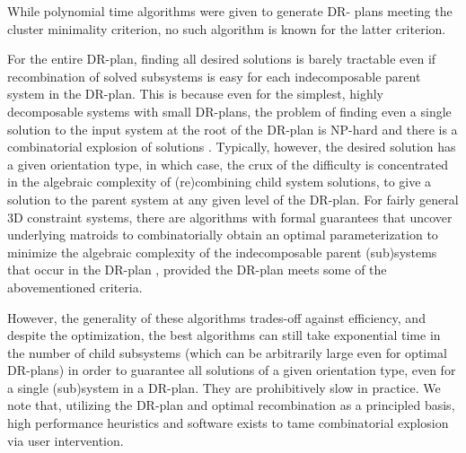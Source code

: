 While polynomial time algorithms were given \cite{hoffman2001decompositionI} to generate DR-
plans meeting the cluster minimality criterion, no such algorithm is
known for the latter criterion.


\medskip\noindent
{}
For the entire DR-plan, finding all desired solutions is barely
tractable even if recombination of solved subsystems is easy for each
indecomposable parent system in the DR-plan. This is because even for
the simplest, highly decomposable systems with small DR-plans, the
problem of finding even a single solution to the input system at the
root of the DR-plan is NP-hard  \cite{saxe1979embeddability}
and there is a combinatorial explosion of solutions \cite{borcea2004number}. Typically, however, the desired
solution has a given orientation type, in which case, the crux of the
difficulty is concentrated in the algebraic complexity of
(re)combining child system solutions, to give a solution to the parent
system at any given level of the DR-plan. For fairly general 3D
constraint systems, there are algorithms with formal guarantees that
uncover underlying matroids to combinatorially obtain an optimal
parameterization to minimize the algebraic complexity of the
indecomposable parent (sub)systems that occur in the DR-plan
\cite{sitharam2010optimized,sitharam2006well,sitharam2010reconciling}, provided the DR-plan meets some of the
abovementioned criteria.

However, the generality of these algorithms trades-off against
efficiency, and despite the optimization, the best algorithms can
still take exponential time in the number of child subsystems (which
can be arbitrarily large even for optimal DR-plans) in order to
guarantee all solutions of a given orientation type, even for a single
(sub)system in a DR-plan. They are prohibitively slow in practice. We
note that, utilizing the DR-plan and optimal recombination as a
principled basis, high performance heuristics and software exists
\cite{sitharam2006solution} to tame combinatorial explosion via user intervention.


